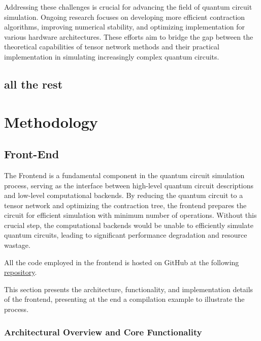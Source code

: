 \documentclass[12pt,oneside,a4paper]{article}
\begin{document}
Addressing these challenges is crucial for advancing the field of quantum circuit simulation. Ongoing research focuses on developing more efficient contraction algorithms, improving numerical stability, and optimizing implementation for various hardware architectures. These efforts aim to bridge the gap between the theoretical capabilities of tensor network methods and their practical implementation in simulating increasingly complex quantum circuits.

\subsection{all the rest}


\section{Methodology}

\subsection{Front-End}



The Frontend is a fundamental component in the quantum circuit simulation process, serving as the interface between high-level quantum circuit descriptions and low-level computational backends. By reducing the quantum circuit to a tensor network and optimizing the contraction tree, the frontend prepares the circuit for efficient simulation with minimum number of operations. Without this crucial step, the computational backends would be unable to efficiently simulate quantum circuits, leading to significant performance degradation and resource wastage.

All the code employed in the frontend is hosted on GitHub at the following \href{https://github.com/federico123579/HPPS24-Quantum-Simulation}{repository}.

This section presents the architecture, functionality, and implementation details of the frontend, presenting at the end a compilation example to illustrate the process.

\subsubsection{Architectural Overview and Core Functionality}
\end{document}
